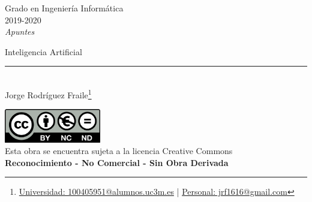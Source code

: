\documentclass[12pt, twoside, openright]{report} %
\begin{document}
	
\begin{titlepage}
	\begin{sffamily}
	\color{azulUC3M}
	\begin{center}
		\begin{figure}[H] %
		\end{figure}
		\vspace{2.5cm}
		\begin{Large}
			Grado en Ingeniería Informática\\			
			2019-2020\\
			\vspace{2cm}		
			\textsl{Apuntes}\\
			\bigskip
		\end{Large}
		 	{\Huge Inteligencia Artificial}\\
		 	\vspace*{0.5cm}
	 		\rule{10.5cm}{0.1mm}\\
			\vspace*{0.9cm}
			{\LARGE Jorge Rodríguez Fraile\footnote{\href{mailto:100405951@alumnos.uc3m.es}{Universidad: 100405951@alumnos.uc3m.es}  |  \href{mailto:jrf1616@gmail.com}{Personal: jrf1616@gmail.com}}}\\ 
			\vspace*{1cm}
	\end{center}
	\vfill
	\color{black}
		\includegraphics[width=4.2cm]{img/creativecommons.png}\\
		Esta obra se encuentra sujeta a la licencia Creative Commons\\ \textbf{Reconocimiento - No Comercial - Sin Obra Derivada}
	\end{sffamily}
\end{titlepage}


\tableofcontents
\thispagestyle{fancy}
\end{document}
